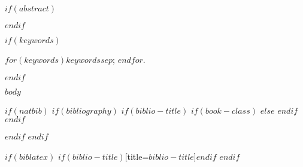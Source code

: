 \documentclass[$for(classoption)$$classoption$$sep$,$endfor$]{jds}
\title$if(short-title)$[$short-title$]$endif${$title$}
\author[$author.marker$]{$author.name$}
\affil[$affiliation.marker$]{$affiliation.name$}
\begin{document}
\maketitle

$if(abstract)$
\begin{abstract}
$abstract$
\end{abstract}
$endif$

$if(keywords)$
\begin{keywords}
$for(keywords)$$keywords$$sep$; $endfor$.
\end{keywords}
$endif$

$body$

$if(natbib)$
$if(bibliography)$
$if(biblio-title)$
$if(book-class)$
\renewcommand\bibname{$biblio-title$}
$else$
\renewcommand\refname{$biblio-title$}
$endif$
$endif$


$endif$
$endif$

$if(biblatex)$
\printbibliography$if(biblio-title)$[title=$biblio-title$]$endif$
$endif$
\end{document}
